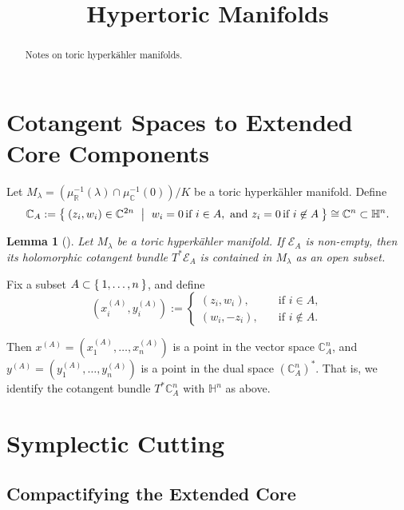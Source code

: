 \documentclass{article}
\title{Hypertoric Manifolds}
\date{}	%
\newtheorem{lemma}[theorem]{Lemma}
\newcommand{\HK}{hyperk\"ahler }
\newcommand{\RR}{\mathbb{R}}
\newcommand{\CC}{\mathbb{C}}
\newcommand{\HH}{\mathbb{H}}
\newcommand{\mcE}{\mathcal{E}}
\newcommand{\pbrackets}[1]{\left( #1 \right)}
\begin{document}
	\maketitle
	
	\begin{abstract}
		Notes on toric \HK manifolds.
	\end{abstract}
	
	\section{Cotangent Spaces to Extended Core Components}
	
	Let $M_{\lambda} = \pbrackets{\mu_{\RR}^{-1}(\lambda) \cap \mu_{\CC}^{-1}(0)}/K$ be a toric \HK manifold. Define
	\begin{equation*}
		\CC_{A} := \Set{ (z_{i}, w_{i}) \in \CC^{2n}\ | \ w_{i} = 0\, \text{if } i \in A, \text{ and } z_{i} = 0\, \text{if } i \not\in A } \cong \CC^{n} \subset \HH^{n}.
	\end{equation*}
	
	\begin{lemma}[\cite{Konno2002}]\label{cotangent:1}
		Let $M_{\lambda}$ be a toric \HK manifold. If $\mcE_{A}$ is non-empty, then its holomorphic cotangent bundle $T^{\ast}\mcE_{A}$ is contained in $M_{\lambda}$ as an open subset.
	\end{lemma}
	
	Fix a subset $A \subset \Set{1, \ldots, n}$, and define
	\begin{equation*}
		(x_{i}^{(A)}, y_{i}^{(A)}) :=
		\begin{cases}
			(z_{i}, w_{i}), \quad &\text{if } i \in A, \\
			(w_{i}, -z_{i}), \quad &\text{if } i \not\in A.
		\end{cases}
	\end{equation*}

	Then $x^{(A)} = (x_{1}^{(A)}, \ldots, x_{n}^{(A)})$ is a point in the vector space $\CC_{A}^{n}$, and $y^{(A)} = (y_{1}^{(A)}, \ldots, y_{n}^{(A)})$ is a point in the dual space $\pbrackets{\CC_{A}^{n}}^{\ast}$. That is, we identify the cotangent bundle $T^{\ast}\CC_{A}^{n}$ with $\HH^{n}$ as above.
	
	\section{Symplectic Cutting}
	
	\subsection{Compactifying the Extended Core}
	
\end{document}
